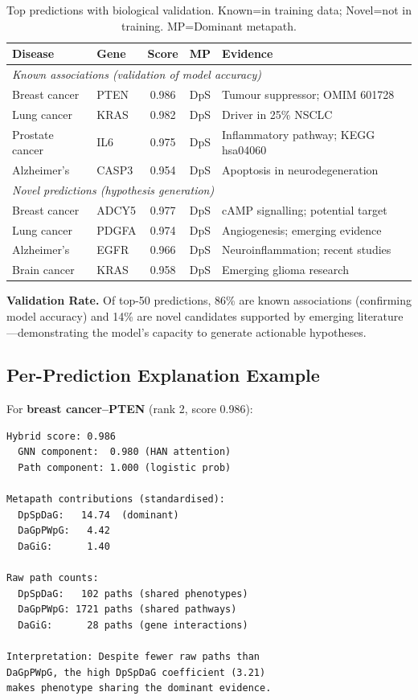 \documentclass{article}
\begin{document}
\begin{table}[h]
\centering
\small
\caption{Top predictions with biological validation. Known=in training data; Novel=not in training. MP=Dominant metapath.}
\label{tab:cases}
\vspace{-0.5em}
\begin{tabular}{p{1.5cm}p{0.8cm}ccp{3.0cm}}
\toprule
\textbf{Disease} & \textbf{Gene} & \textbf{Score} & \textbf{MP} & \textbf{Evidence} \\
\midrule
\multicolumn{5}{l}{\textit{Known associations (validation of model accuracy)}} \\
\midrule
Breast cancer & PTEN & 0.986 & DpS & Tumour suppressor; OMIM 601728 \\
Lung cancer & KRAS & 0.982 & DpS & Driver in 25\% NSCLC \\
Prostate cancer & IL6 & 0.975 & DpS & Inflammatory pathway; KEGG hsa04060 \\
Alzheimer's & CASP3 & 0.954 & DpS & Apoptosis in neurodegeneration \\
\midrule
\multicolumn{5}{l}{\textit{Novel predictions (hypothesis generation)}} \\
\midrule
Breast cancer & ADCY5 & 0.977 & DpS & cAMP signalling; potential target \\
Lung cancer & PDGFA & 0.974 & DpS & Angiogenesis; emerging evidence \\
Alzheimer's & EGFR & 0.966 & DpS & Neuroinflammation; recent studies \\
Brain cancer & KRAS & 0.958 & DpS & Emerging glioma research \\
\bottomrule
\end{tabular}
\end{table}

\textbf{Validation Rate.} Of top-50 predictions, 86\% are known associations (confirming model accuracy) and 14\% are novel candidates supported by emerging literature---demonstrating the model's capacity to generate actionable hypotheses.

\subsection{Per-Prediction Explanation Example}

For \textbf{breast cancer--PTEN} (rank 2, score 0.986):

\begin{small}
\begin{verbatim}
Hybrid score: 0.986
  GNN component:  0.980 (HAN attention)
  Path component: 1.000 (logistic prob)

Metapath contributions (standardised):
  DpSpDaG:   14.74  (dominant)
  DaGpPWpG:   4.42
  DaGiG:      1.40

Raw path counts:
  DpSpDaG:   102 paths (shared phenotypes)
  DaGpPWpG: 1721 paths (shared pathways)
  DaGiG:      28 paths (gene interactions)

Interpretation: Despite fewer raw paths than
DaGpPWpG, the high DpSpDaG coefficient (3.21)
makes phenotype sharing the dominant evidence.
\end{verbatim}
\end{small}
\end{document}
